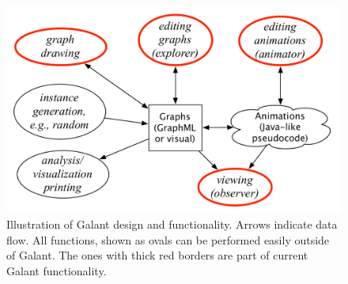 \begin{figure}

\centering

\includegraphics[width=\columnwidth]{X_overview_diagram}

\caption{Illustration of Galant design and functionality. Arrows indicate
  data flow. All functions, shown as ovals can be performed easily outside of
Galant. The ones with thick red borders are part of current Galant
functionality.}

\label{fig:overview_diagram}
\end{figure}

